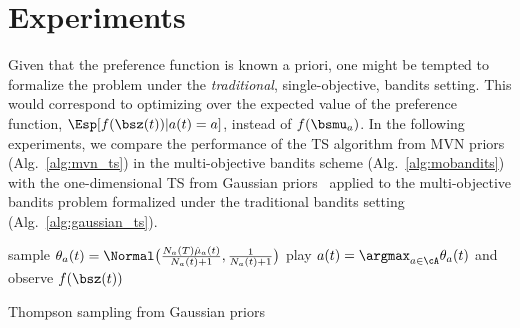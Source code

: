 
\section{Experiments}
\label{sec:experiments}

Given that the preference function is known a priori, one might be tempted to formalize the problem under the \emph{traditional}, single-objective, bandits setting. This would correspond to optimizing over the expected value of the preference function, $\Esp[f(\bsz(t)) | a(t) =a]$, instead of $f(\bsmu_a)$. In the following experiments, we compare the performance of the TS algorithm from MVN priors (Alg.~\ref{alg:mvn_ts}) in the multi-objective bandits scheme (Alg.~\ref{alg:mobandits}) with the one-dimensional TS from Gaussian priors~\cite{Agrawal2013} applied to the multi-objective bandits problem formalized under the traditional bandits setting (Alg.~\ref{alg:gaussian_ts}).

\begin{algorithm}[t]
    \begin{algorithmic}[1]
                \STATE sample $\theta_a(t) = \Normal \big( \frac{N_a(T) \hat \mu_a(t)}{N_a(t) + 1}, \frac{1}{N_a(t) + 1} \big)$
            \ENDFOR
            \STATE play $a(t) = \argmax_{a \in \cA} \theta_a(t)$ and observe $f(\bsz(t))$
        \ENDFOR
    \end{algorithmic}
    \caption{Thompson sampling from Gaussian priors~\cite{Agrawal2013}}
\label{alg:gaussian_ts}
\end{algorithm}

